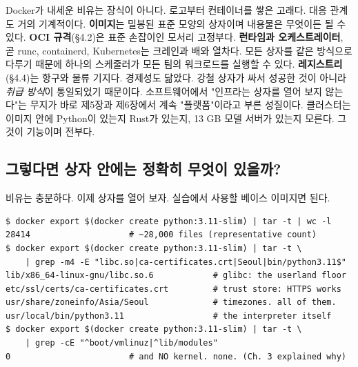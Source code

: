 Docker가 내세운 비유는 장식이 아니다. 로고부터 컨테이너를 쌓은 고래다. 대응 관계도 거의 기계적이다. \textbf{이미지}는 밀봉된 표준 모양의 상자이며 내용물은 무엇이든 될 수 있다. \textbf{OCI 규격}(§4.2)은 표준 손잡이인 모서리 고정부다. \textbf{런타임과 오케스트레이터}, 곧 runc, containerd, Kubernetes는 크레인과 배와 열차다. 모든 상자를 같은 방식으로 다루기 때문에 하나의 스케줄러가 모든 팀의 워크로드를 실행할 수 있다. \textbf{레지스트리}(§4.4)는 항구와 물류 기지다. 경제성도 닮았다. 강철 상자가 싸서 성공한 것이 아니라 \textit{취급 방식}이 통일되었기 때문이다. 소프트웨어에서 "인프라는 상자를 열어 보지 않는다"는 무지가 바로 제5장과 제6장에서 계속 "플랫폼"이라고 부른 성질이다. 클러스터는 이미지 안에 Python이 있는지 Rust가 있는지, 13 GB 모델 서버가 있는지 모른다. 그것이 기능이며 전부다.

\subsection*{그렇다면 상자 안에는 정확히 무엇이 있을까?}

비유는 충분하다. 이제 상자를 열어 보자. 실습에서 사용할 베이스 이미지면 된다.

\begin{terminalbox}
\begin{Verbatim}[breaklines=true,breakanywhere=true,fontsize=\small,formatcom=\color{tbbtermfg},codes=\tbbcodeactive]
$ docker export $(docker create python:3.11-slim) | tar -t | wc -l
28414                    # ~28,000 files (representative count)
$ docker export $(docker create python:3.11-slim) | tar -t \
    | grep -m4 -E "libc.so|ca-certificates.crt|Seoul|bin/python3.11$"
lib/x86_64-linux-gnu/libc.so.6            # glibc: the userland floor
etc/ssl/certs/ca-certificates.crt         # trust store: HTTPS works
usr/share/zoneinfo/Asia/Seoul             # timezones. all of them.
usr/local/bin/python3.11                  # the interpreter itself
$ docker export $(docker create python:3.11-slim) | tar -t \
    | grep -cE "^boot/vmlinuz|^lib/modules"
0                        # and NO kernel. none. (Ch. 3 explained why)
\end{Verbatim}
\end{terminalbox}


